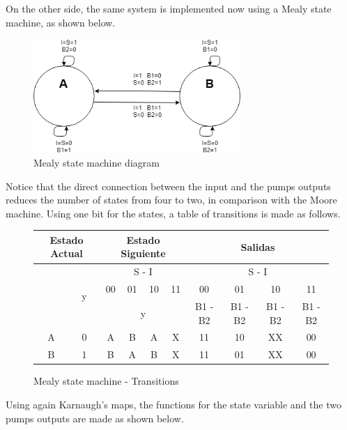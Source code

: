 On the other side, the same system is implemented 
now using a Mealy state machine, as shown below.

\begin{figure}[H]
    \begin{centering}
    \includegraphics[width=0.7\textwidth]{data/Graficos1/1b_fsm.png}
    \par\end{centering}
    \caption{Mealy state machine diagram}
\end{figure}

Notice that the direct connection between the 
input and the pumps outputs reduces the number 
of states from four to two, in comparison with 
the Moore machine.
Using one bit for the states, a table of transitions
is made as follows.

\begin{figure}[H]
\begin{centering}
\begin{tabular}{|c|c|c|c|c|c||c|c|c|c|}
    \hline 
    \multicolumn{2}{|c|}{Estado Actual} & \multicolumn{4}{c||}{Estado Siguiente} & \multicolumn{4}{c|}{Salidas}\tabularnewline
    \hline 
    \hline 
    \multirow{3}{*}{} & \multirow{3}{*}{y} & \multicolumn{4}{c||}{S - I} & \multicolumn{4}{c|}{S - I}\tabularnewline
    \cline{3-10} 
     &  & 00 & 01 & 10 & 11 & 00 & 01 & 10 & 11\tabularnewline
    \cline{3-10} 
     &  & \multicolumn{4}{c||}{y} & B1 - B2 & B1 - B2 & B1 - B2 & B1 - B2\tabularnewline
    \hline 
    A & 0 & A & B & A & X & 11 & 10 & XX & 00\tabularnewline
    \hline 
    B & 1 & B & A & B & X & 11 & 01 & XX & 00\tabularnewline
    \hline 
    \end{tabular}
    \caption{Mealy state machine - Transitions}
\end{centering}
\end{figure}

Using again Karnaugh's maps, the functions for
the state variable and the two pumps outputs are
made as shown below.

